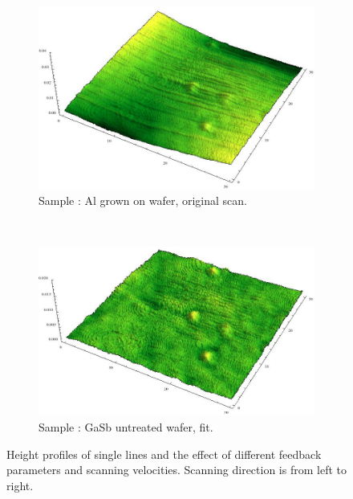 \begin{figure}
    \begin{subfigure}{0.45\columnwidth}
         \includegraphics[width=\textwidth]{Bilder/s4_al_orig.jpg}
         \caption{Sample : Al grown on wafer, original scan.}
        \label{s4_orig}
    \end{subfigure}
    ~
    \begin{subfigure}{0.45\columnwidth}
         \includegraphics[width=\textwidth]{Bilder/s4_al_f.jpg}
         \caption{Sample : GaSb untreated wafer, fit.}
        \label{s3_flat}
    \end{subfigure}
\caption{Height profiles of single lines and the effect of different 
    feedback parameters and scanning velocities. Scanning direction is from left 
    to right.}
\end{figure}


